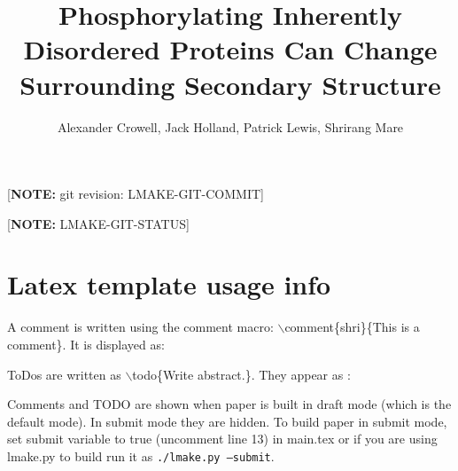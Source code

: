 \documentclass[twocolumn]{article}     %
\newcommand{\comment}[2]{\relax}
\newcommand{\todo}[1]{\relax}
\newcommand{\comment}[2]{\textcolor{commentcolor}{(#2 \emph{--#1})}}
\newcommand{\todo}[1]{\textcolor{commentcolor}{(TODO: #1)}}
\begin{document}
\title{Phosphorylating Inherently Disordered Proteins Can Change Surrounding Secondary Structure}

\author{Alexander Crowell, Jack Holland, Patrick Lewis, Shrirang Mare}

\date{}

\maketitle

\ifsubmit
{}

[\textbf{NOTE:} git revision: LMAKE-GIT-COMMIT]

[\textbf{NOTE:} LMAKE-GIT-STATUS]

\fi



\ifsubmit
\else

\section*{Latex template usage info}

A comment is written using the comment macro: $\backslash$comment\{shri\}\{This is a comment\}. It is displayed as:

\comment{shri}{This is a comment}


ToDos are written as $\backslash$todo\{Write abstract.\}. They appear as :

\todo{Write abstract.}

Comments and TODO are shown when paper is built in draft mode (which is the default mode). In submit mode they are hidden. To build paper in submit mode, set submit variable to true (uncomment line 13) in main.tex or if you are using lmake.py to build run it as \texttt{./lmake.py --submit}.
\fi










\end{document}
